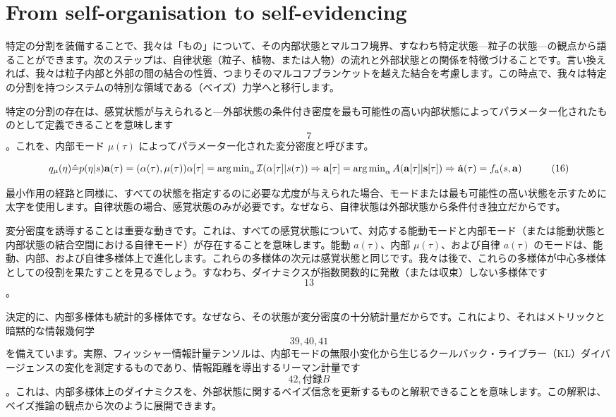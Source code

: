 \documentclass[a4paper, titlepage]{jsarticle}
\begin{document}
\section{From self-organisation to self-evidencing}
特定の分割を装備することで、我々は「もの」について、その内部状態とマルコフ境界、すなわち特定状態—粒子の状態—の観点から語ることができます。次のステップは、自律状態（粒子、植物、または人物）の流れと外部状態との関係を特徴づけることです。言い換えれば、我々は粒子内部と外部の間の結合の性質、つまりそのマルコフブランケットを越えた結合を考慮します。この時点で、我々は特定の分割を持つシステムの特別な領域である（ベイズ）力学へと移行します。

特定の分割の存在は、感覚状態が与えられると—外部状態の条件付き密度を最も可能性の高い内部状態によってパラメーター化されたものとして定義できることを意味します \[7\]。これを、内部モード $\mu(\tau)$ によってパラメーター化された変分密度と呼びます。

$$
q_{\mu}(\eta) \hat{=} p(\eta | s) \\
\mathbf{a}(\tau) = (\mathbf{\alpha}(\tau), \mathbf{\mu}(\tau)) \\
\mathbf{\alpha}[\tau] = \operatorname{arg\,min}_{\alpha} \mathcal{I}(\mathbf{\alpha}[\tau] | s(\tau)) \Rightarrow \\
\mathbf{a}[\tau] = \operatorname{arg\,min}_{\alpha} A(\mathbf{a}[\tau] | \mathbf{s}[\tau]) \Rightarrow \\
\dot{\mathbf{a}}(\tau) = f_a(s, \mathbf{a}) \quad \quad \quad (16)
$$

最小作用の経路と同様に、すべての状態を指定するのに必要な尤度が与えられた場合、モードまたは最も可能性の高い状態を示すために太字を使用します。自律状態の場合、感覚状態のみが必要です。なぜなら、自律状態は外部状態から条件付き独立だからです。

変分密度を誘導することは重要な動きです。これは、すべての感覚状態について、対応する能動モードと内部モード（または能動状態と内部状態の結合空間における自律モード）が存在することを意味します。能動 $a(\tau)$、内部 $\mu(\tau)$、および自律 $a(\tau)$ のモードは、能動、内部、および自律多様体上で進化します。これらの多様体の次元は感覚状態と同じです。我々は後で、これらの多様体が中心多様体としての役割を果たすことを見るでしょう。すなわち、ダイナミクスが指数関数的に発散（または収束）しない多様体です \[13\]。

決定的に、内部多様体も統計的多様体です。なぜなら、その状態が変分密度の十分統計量だからです。これにより、それはメトリックと暗黙的な情報幾何学 \[39, 40, 41\] を備えています。実際、フィッシャー情報計量テンソルは、内部モードの無限小変化から生じるクールバック・ライブラー（KL）ダイバージェンスの変化を測定するものであり、情報距離を導出するリーマン計量です \[42, 付録B\]。これは、内部多様体上のダイナミクスを、外部状態に関するベイズ信念を更新するものと解釈できることを意味します。この解釈は、ベイズ推論の観点から次のように展開できます。
\end{document}
